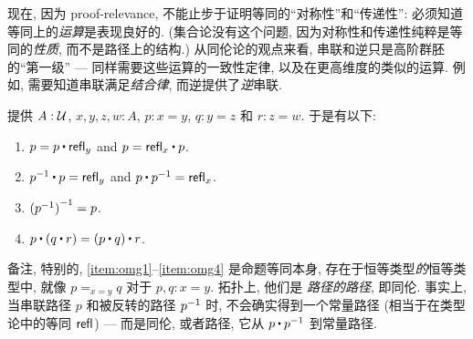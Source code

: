 现在, 因为 proof-relevance, 不能止步于证明等同的``对称性''和``传递性'': 必须知道等同上的\emph{运算}是表现良好的.
(集合论没有这个问题, 因为对称性和传递性纯粹是等同的\emph{性质}, 而不是路径上的结构.)
从同伦论的观点来看, 串联和逆只是高阶群胚的``第一级'' --- 同样需要这些运算的一致性定律, 以及在更高维度的类似的运算.
例如, 需要知道串联满足\emph{结合律}, 而逆提供了\emph{逆}串联.

\begin{lem}
    \label{thm:omg}%
    提供 $A:\mathcal{U}$, $x,y,z,w:A$, $p:x= y$, $q:y = z$ 和 $r:z=w$.
    于是有以下:
    \begin{enumerate}
        \item $p= p\ct \refl{y}$ and $p = \refl{x} \ct p$.\label{item:omg1}
        \item $\opp{p}\ct p= \refl{y}$ and $p\ct \opp{p}= \refl{x}$.\label{item:omg2}
        \item $\mathord{{(\mathord{{p}^{-1}})}^{-1}}= p$.\label{item:omg3}
        \item $p\ct (q\ct r)= (p\ct q)\ct r$.\label{item:omg4}
    \end{enumerate}
\end{lem}

备注, 特别的, \ref{item:omg1}--\ref{item:omg4} 是命题等同本身, 存在于恒等类型\emph{的}恒等类型中, 就像 $p=_{x=y}q$ 对于 $p,q:x=y$.
拓扑上, 他们是 \emph{路径的路径}, 即同伦.
事实上, 当串联路径 $p$ 和被反转的路径 $\mathord{{p}^{-1}}$ 时, 不会确实得到一个常量路径 (相当于在类型论中的等同 $\mathsf{refl}_{}$) --- 而是同伦, 或者路径, 它从 $p\ct\opp p$ 到常量路径.

